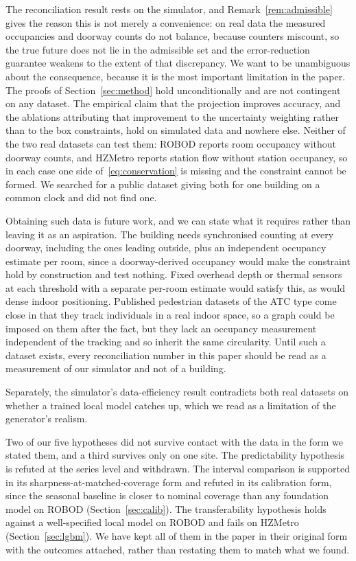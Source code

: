 \documentclass[11pt]{article}
\theoremstyle{plain}
\theoremstyle{definition}
\theoremstyle{remark}
\newif\ifrevisionmarkup
\newcommand{\new}[1]{\ifrevisionmarkup\textcolor{revision}{#1}\else#1\fi}
\begin{document}
The reconciliation result rests on the simulator, and Remark~\ref{rem:admissible} gives the reason this is not merely a convenience: on real data the measured occupancies and doorway counts do not balance, because counters miscount, so the true future does not lie in the admissible set and the error-reduction guarantee weakens to the extent of that discrepancy. \new{We want to be unambiguous about the consequence, because it is the most important limitation in the paper. The proofs of Section~\ref{sec:method} hold unconditionally and are not contingent on any dataset. The empirical claim that the projection improves accuracy, and the ablations attributing that improvement to the uncertainty weighting rather than to the box constraints, hold on simulated data and nowhere else. Neither of the two real datasets can test them: ROBOD reports room occupancy without doorway counts, and HZMetro reports station flow without station occupancy, so in each case one side of~\eqref{eq:conservation} is missing and the constraint cannot be formed. We searched for a public dataset giving both for one building on a common clock and did not find one.}

\new{Obtaining such data is future work, and we can state what it requires rather than leaving it as an aspiration. The building needs synchronised counting at every doorway, including the ones leading outside, plus an independent occupancy estimate per room, since a doorway-derived occupancy would make the constraint hold by construction and test nothing. Fixed overhead depth or thermal sensors at each threshold with a separate per-room estimate would satisfy this, as would dense indoor positioning. Published pedestrian datasets of the ATC type come close in that they track individuals in a real indoor space, so a graph could be imposed on them after the fact, but they lack an occupancy measurement independent of the tracking and so inherit the same circularity. Until such a dataset exists, every reconciliation number in this paper should be read as a measurement of our simulator and not of a building.}

Separately, the simulator's data-efficiency result contradicts both real datasets on whether a trained local model catches up, which we read as a limitation of the generator's realism.

Two of our five hypotheses did not survive contact with the data in the form we stated them\new{, and a third survives only on one site}. The predictability hypothesis is refuted at the series level and withdrawn. The interval comparison is supported \new{in its sharpness-at-matched-coverage form and refuted in its calibration form, since the seasonal baseline is closer to nominal coverage than any foundation model on ROBOD (Section~\ref{sec:calib}). The transferability hypothesis holds against a well-specified local model on ROBOD and fails on HZMetro (Section~\ref{sec:lgbm})}. We have kept \new{all of them} in the paper in their original form with the outcomes attached, rather than restating them to match what we found.
\end{document}
